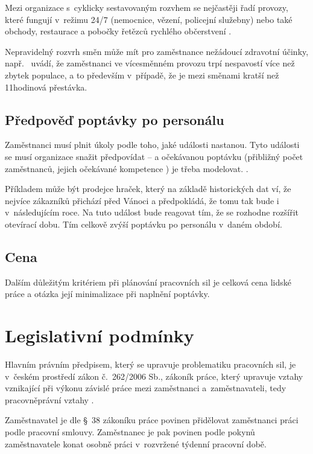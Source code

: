 \documentclass[twoside]{ctuthesis}
\begin{document}
Mezi organizace s~cyklicky sestavovaným rozvhem se nejčastěji řadí provozy, které fungují v~režimu 24/7 (nemocnice, vězení, policejní služebny) nebo také obchody, restaurace a pobočky řetězců rychlého občerstvení \cite{bechtold1981work}.

Nepravidelný rozvrh směn může mít pro zaměstnance nežádoucí zdravotní účinky, např.~\cite{flo2013shift} uvádí, že zaměstnanci ve vícesměnném provozu trpí nespavostí více než zbytek populace, a to především v~případě, že je mezi směnami kratší než 11hodinová přestávka.

\subsection{Předpověď poptávky po personálu}
\label{sub:demand}
Zaměstnanci musí plnit úkoly podle toho, jaké události nastanou. Tyto události se musí organizace snažit předpovídat – a očekávanou poptávku (přibližný počet zaměstnanců, jejich očekávané kompetence \cite[s.~219]{armstrong2014}) je třeba modelovat. \cite{ernst2004staff}.

Příkladem může být prodejce hraček, který na základě historických dat ví, že nejvíce zákazníků přichází před Vánoci a předpokládá, že tomu tak bude i v~následujícím roce. Na tuto událost bude reagovat tím, že se rozhodne rozšířit otevírací dobu. Tím celkově zvýší poptávku po personálu v~daném období.

\subsection{Cena}
Dalším důležitým kritériem při plánování pracovních sil je celková cena lidské práce a otázka její minimalizace při naplnění poptávky.


\section{Legislativní podmínky}
\label{section:legislativa}
Hlavním právním předpisem, který se upravuje problematiku pracovních sil, je v~českém prostředí zákon č.~262/2006 Sb., zákoník práce, který upravuje vztahy vznikající při výkonu závislé práce mezi zaměstnanci a~zaměstnavateli, tedy pracovněprávní vztahy \cite{zakonik06-262}.

Zaměstnavatel je dle §~38 zákoníku práce povinen přidělovat zaměstnanci práci podle pracovní smlouvy. Zaměstnanec je pak povinen podle pokynů zaměstnavatele konat osobně práci v~rozvržené týdenní pracovní době.
\end{document}
